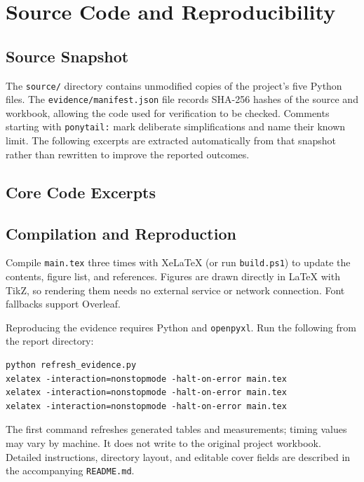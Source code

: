 \chapter[Appendix: Source Code]{Source Code and Reproducibility}
\section{Source Snapshot}
The \texttt{source/} directory contains unmodified copies of the project's five Python files. The \texttt{evidence/manifest.json} file records SHA-256 hashes of the source and workbook, allowing the code used for verification to be checked. Comments starting with \texttt{ponytail:} mark deliberate simplifications and name their known limit. The following excerpts are extracted automatically from that snapshot rather than rewritten to improve the reported outcomes.

\section{Core Code Excerpts}

\clearpage
\section{Compilation and Reproduction}
Compile \texttt{main.tex} three times with XeLaTeX (or run \texttt{build.ps1}) to update the contents, figure list, and references. Figures are drawn directly in LaTeX with TikZ, so rendering them needs no external service or network connection. Font fallbacks support Overleaf.

Reproducing the evidence requires Python and \texttt{openpyxl}. Run the following from the report directory:
\par\noindent\begin{minipage}{\linewidth}
\begin{Verbatim}[fontsize=\small,frame=single]
python refresh_evidence.py
xelatex -interaction=nonstopmode -halt-on-error main.tex
xelatex -interaction=nonstopmode -halt-on-error main.tex
xelatex -interaction=nonstopmode -halt-on-error main.tex
\end{Verbatim}
\end{minipage}\par\medskip\noindent The first command refreshes generated tables and measurements; timing values may vary by machine. It does not write to the original project workbook. Detailed instructions, directory layout, and editable cover fields are described in the accompanying \texttt{README.md}.
